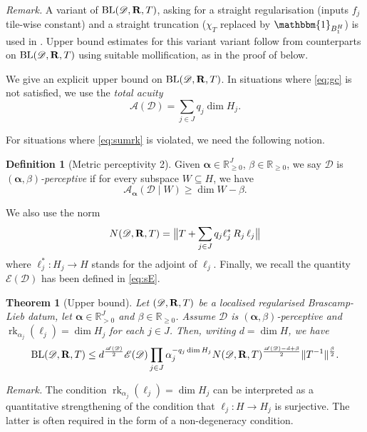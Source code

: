 \documentclass[a4paper,english]{amsart}
\newtheorem{thm}{Theorem}[section]
\theoremstyle{definition}
\newtheorem*{definition}{Definition}
\newenvironment{remark}{\par\medskip \noindent \textit{Remark.} \rmfamily}{\medskip}
\newcommand{\R}{\mathbb{R}}
\newcommand{\bba}{\boldsymbol{\alpha}}
\newcommand{\1}{\mathbbm{1}}
\newcommand{\bbR}{{\bf{R}}}
\newcommand{\sD} {{\mathscr D}}
\newcommand{\sE}{\mathscr{E}}
\newcommand{\sA}{\mathscr{A}}
\DeclareMathOperator{\rk}{rk}
\newcommand{\norm}[1]{\lVert#1\rVert}   %
\DeclareMathOperator{\BL}{BL}
\begin{document}
\begin{remark}
A variant of $\BL(\sD, \bbR, T)$, asking for a straight regularisation (inputs $f_{j}$ tile-wise constant) and a straight truncation ($\chi_T$ replaced by $\1_{B_1^H}$) is used in \cite{BCCT10, Maldague22, Zorin}. Upper bound estimates for this variant variant follow from counterparts on  $\BL(\sD, \bbR, T)$ using suitable mollification, as in the proof of  below.
\end{remark}


\bigskip
We give an explicit upper bound on $\BL(\sD, \bbR, T)$.
In situations  where \eqref{eq:gc} is not satisfied, we use the \emph{total acuity}
$$\sA(\sD)=\sum_{j\in J}q_{j}\dim H_{j}.$$

For situations where \eqref{eq:sumrk} is violated, we need the following notion.
\begin{definition}[Metric perceptivity 2]
Given $\bba\in \R_{\geq0}^J$, $\beta\in \R_{\geq0}$, we say $\sD$ is \emph{$(\bba, \beta)$-perceptive}  if for every subspace $W\subseteq H$, we have
\begin{equation}\label{def-alpha-beta-percep}
\sA_{\bba}(\sD \mid W)  \geq \dim W -\beta.
\end{equation}
\end{definition}

We also use the norm
\[
N(\sD, \bbR, T)=\big\|T+ \sum_{j \in J} q_{j} \ell^*_{j} \,R_{j}\, \ell_{j} \big\|
\]
where $\ell^*_{j}:H_{j}\rightarrow H$ stands for the adjoint of $\ell_{j}$. Finally, we recall the quantity $\sE(\sD)$ has been defined in \eqref{eq:sE}.

\begin{thm}[Upper bound]\label{pr:rlub}
Let $(\sD,\bbR, T)$ be a  localised regularised Brascamp-Lieb datum, let  $\bba \in \R_{>0}^J$ and $\beta \in \R_{\geq 0}$. Assume $\sD$ is $(\bba, \beta)$-perceptive and  $\rk_{\alpha_j}(\ell_j) = \dim H_j$ for each $j \in J$.
Then, writing $d = \dim H$, we have
\begin{equation}\label{eq:rlub}
\BL(\sD, \bbR, T)
\leq d^{\frac{\sA(\sD)}{2}}  \sE(\sD) \prod_{j \in J} \alpha_j^{-q_j \dim H_j}  N(\sD, \bbR, T)^{\frac{\sA(\sD)-d+\beta}{2}} \norm{T^{-1}}^{\frac{\beta}{2}}.
\end{equation}
\end{thm}




\begin{remark}
The condition $\rk_{\alpha_j}(\ell_j) = \dim H_j$ can be interpreted as a quantitative strengthening of the condition that $\ell_j \colon H \to H_j$ is surjective.
The latter is often required in the form of a non-degeneracy condition.
\end{remark}
\end{document}
